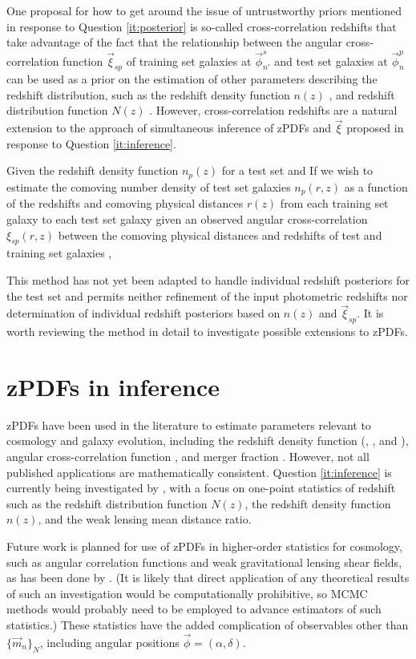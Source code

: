 \documentclass[12pt, onecolumn]{emulateapj}
\begin{document}
One proposal for how to get around the issue of untrustworthy priors mentioned in response to Question \ref{it:posterior} is so-called cross-correlation redshifts that take advantage of the fact that the relationship between the angular cross-correlation function $\vec{\xi}_{sp}$ of training set galaxies at $\vec{\phi}^{s}_{n'}$ and test set galaxies at $\vec{\phi}^{p}_{n}$ can be used as a prior on the estimation of other parameters describing the redshift distribution, such as the redshift density function $n(z)$ \citep{new08}, \citep{men13} and redshift distribution function $N(z)$ \citep{mat10}.  However, cross-correlation redshifts are a natural extension to the approach of simultaneous inference of zPDFs and $\vec{\xi}$ proposed in response to Question \ref{it:inference}.

Given the redshift density function $n_{p}(z)$ for a test set and If we wish to estimate the comoving number density of test set galaxies $n_{p}(r,z)$ as a function of the redshifts and comoving physical distances $r(z)$ from each training set galaxy to each test set galaxy given an observed angular cross-correlation $\xi_{sp}(r,z)$ between the comoving physical distances and redshifts of test and training set galaxies ,  \citep{new08}

This method has not yet been adapted to handle individual redshift posteriors for the test set and permits neither refinement of the input photometric redshifts nor determination of individual redshift posteriors based on $n(z)$ and $\vec{\xi}_{sp}$.  It is worth reviewing the method in detail to investigate possible extensions to zPDFs.

\section{zPDFs in inference}

zPDFs have been used in the literature to estimate parameters relevant to cosmology and galaxy evolution, including the redshift density function (\citet{she11}, \citet{bon13}, and \citet{vii15}), angular cross-correlation function \citep{mye09}, and merger fraction \citep{lop14}.  However, not all published applications are mathematically consistent.   Question \ref{it:inference} is currently being investigated by \citet{mal15}, with a focus on one-point statistics of redshift such as the redshift distribution function $N(z)$, the redshift density function $n(z)$, and the weak lensing mean distance ratio.

Future work is planned for use of zPDFs in higher-order statistics for cosmology, such as angular correlation functions and weak gravitational lensing shear fields, as has been done by \citet{man07}.  (It is likely that direct application of any theoretical results of such an investigation would be computationally prohibitive, so MCMC methods would probably need to be employed to advance estimators of such statistics.)  These statistics have the added complication of observables other than $\{\vec{m}_{n}\}_{N}$, including angular positions $\vec{\phi}=(\alpha,\delta)$.  
\end{document}
